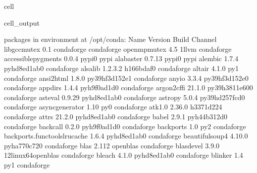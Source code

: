 \documentclass[letterpaper,table,10pt,english]{jupyterBook}
\begin{document}
\begin{sphinxuseclass}{cell}
\begin{sphinxVerbatimOutput}
\begin{sphinxuseclass}{cell_output}
\begin{sphinxVerbatim}[commandchars=\\\{\}]
\PYGZsh{} packages in environment at /opt/conda:
\PYGZsh{}
\PYGZsh{} Name                    Version                   Build  Channel
\PYGZus{}libgcc\PYGZus{}mutex             0.1                 conda\PYGZus{}forge    conda\PYGZhy{}forge
\PYGZus{}openmp\PYGZus{}mutex             4.5                      1\PYGZus{}llvm    conda\PYGZhy{}forge
accessible\PYGZhy{}pygments       0.0.4                    pypi\PYGZus{}0    pypi
alabaster                 0.7.13                   pypi\PYGZus{}0    pypi
alembic                   1.7.4              pyhd8ed1ab\PYGZus{}0    conda\PYGZhy{}forge
alsa\PYGZhy{}lib                  1.2.3.2              h166bdaf\PYGZus{}0    conda\PYGZhy{}forge
altair                    4.1.0                      py\PYGZus{}1    conda\PYGZhy{}forge
ansi2html                 1.8.0            py39hf3d152e\PYGZus{}1    conda\PYGZhy{}forge
anyio                     3.3.4            py39hf3d152e\PYGZus{}0    conda\PYGZhy{}forge
appdirs                   1.4.4              pyh9f0ad1d\PYGZus{}0    conda\PYGZhy{}forge
argon2\PYGZhy{}cffi               21.1.0           py39h3811e60\PYGZus{}0    conda\PYGZhy{}forge
asteval                   0.9.29             pyhd8ed1ab\PYGZus{}0    conda\PYGZhy{}forge
astropy                   5.0.4            py39hd257fcd\PYGZus{}0    conda\PYGZhy{}forge
async\PYGZus{}generator           1.10                       py\PYGZus{}0    conda\PYGZhy{}forge
atk\PYGZhy{}1.0                   2.36.0               h3371d22\PYGZus{}4    conda\PYGZhy{}forge
attrs                     21.2.0             pyhd8ed1ab\PYGZus{}0    conda\PYGZhy{}forge
babel                     2.9.1              pyh44b312d\PYGZus{}0    conda\PYGZhy{}forge
backcall                  0.2.0              pyh9f0ad1d\PYGZus{}0    conda\PYGZhy{}forge
backports                 1.0                        py\PYGZus{}2    conda\PYGZhy{}forge
backports.functools\PYGZus{}lru\PYGZus{}cache 1.6.4              pyhd8ed1ab\PYGZus{}0    conda\PYGZhy{}forge
beautifulsoup4            4.10.0             pyha770c72\PYGZus{}0    conda\PYGZhy{}forge
blas                      2.112                  openblas    conda\PYGZhy{}forge
blas\PYGZhy{}devel                3.9.0           12\PYGZus{}linux64\PYGZus{}openblas    conda\PYGZhy{}forge
bleach                    4.1.0              pyhd8ed1ab\PYGZus{}0    conda\PYGZhy{}forge
blinker                   1.4                        py\PYGZus{}1    conda\PYGZhy{}forge

\end{sphinxVerbatim}
\end{sphinxuseclass}
\end{sphinxVerbatimOutput}
\end{sphinxuseclass}
\end{document}
